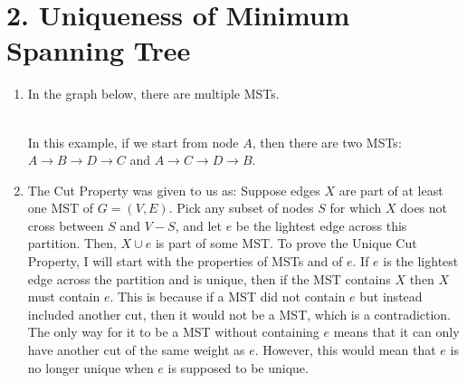 \documentclass[11pt]{article}
\begin{document}
\section*{2.  Uniqueness of Minimum Spanning Tree}
\begin{enumerate}[label=(\alph*)]
\item
In the graph below, there are multiple MSTs.
\\
\\
In this example, if we start from node $A$, then there are two MSTs: $A \rightarrow B \rightarrow D \rightarrow C$ and $A \rightarrow C \rightarrow D \rightarrow B$.

\item
The Cut Property was given to us as: Suppose edges $X$ are part of at least one MST of $G = (V, E)$. Pick any subset of nodes $S$ for which $X$ does not cross between $S$ and $V − S$, and let $e$ be the lightest edge across this partition. Then, $X \cup {e}$ is part of some MST. To prove the Unique Cut Property, I will start with the properties of MSTs and of $e$. If $e$ is the lightest edge across the partition and is unique, then if the MST contains $X$ then $X$ must contain $e$. This is because if a MST did not contain $e$ but instead included another cut, then it would not be a MST, which is a contradiction. The only way for it to be a MST without containing $e$ means that it can only have another cut of the same weight as $e$. However, this would mean that $e$ is no longer unique when $e$ is supposed to be unique.


\end{enumerate}
\end{document}
